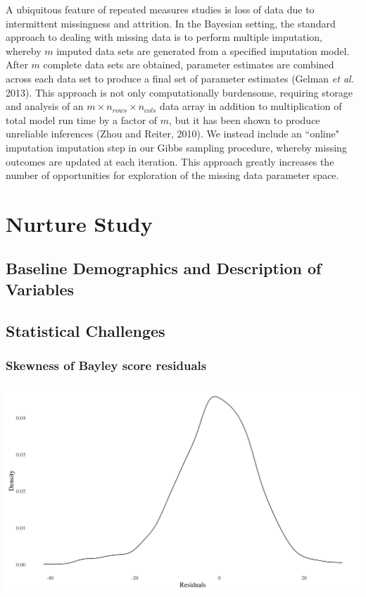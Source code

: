 \documentclass[useAMS,referee]{biom}
\let\origfigure\figure
\let\endorigfigure\endfigure
\renewenvironment{figure}[1][2] {
    \expandafter\origfigure\expandafter[H]
} {
    \endorigfigure
}
\begin{document}
A ubiquitous feature of repeated measures studies is loss of data due to intermittent missingness and attrition. In the Bayesian setting, the standard approach to dealing with missing data is to perform multiple imputation, whereby $m$ imputed data sets are generated from a specified imputation model. After $m$ complete data sets are obtained, parameter estimates are combined across each data set to produce a final set of parameter estimates (Gelman \textit{et al.} 2013). This approach is not only computationally burdensome, requiring storage and analysis of an $m \times n_{rows} \times n_{cols}$ data array in addition to multiplication of total model run time by a factor of $m$, but it has been shown to produce unreliable inferences (Zhou and Reiter, 2010). We instead include an ``online" imputation imputation step in our Gibbs sampling procedure, whereby missing outcomes are updated at each iteration. This approach greatly increases the number of opportunities for exploration of the missing data parameter space.

\newpage

\section{Nurture Study}
\label{s:nurt}
\subsection{Baseline Demographics and Description of Variables}

\subsection{Statistical Challenges}
\subsubsection{Skewness of Bayley score residuals}

\vspace{1mm}
\begin{figure}[h]
	\caption{The distribution of residuals in repeates measures regression model of Bayley composite scores adjusted for race and sex.}
	\centering
	\includegraphics[scale = 0.14]{bayley_resids_plot}
\end{figure}
\end{document}
